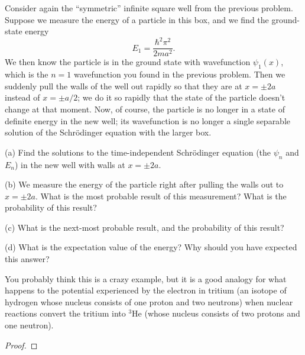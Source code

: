 \documentclass{article}
\begin{document}
\begin{ques}\label{q7}
Consider again the “symmetric” infinite square well from the previous problem. Suppose
we measure the energy of a particle in this box, and we find the ground-state energy
\[
E_1 = \frac{\hbar^2\pi^2}{2ma^2}.
\]
We then know the particle is in the ground state with wavefunction $\psi_1(x)$,
which is the $n = 1$ wavefunction you found in the previous problem. Then we suddenly
pull the walls of the well out rapidly so that they are at $x = \pm 2a$ instead of $x = \pm a/2$; we do
it so rapidly that the state of the particle doesn’t change at that moment. Now, of course,
the particle is no longer in a state of definite energy in the new well; its wavefunction is no
longer a single separable solution of the Schrödinger equation with the larger box.

(a) Find the solutions to the time-independent Schrödinger equation (the $\psi_n$ and $E_n$) in
the new well with walls at $x = \pm 2a$.

(b) We measure the energy of the particle right after pulling the walls out to $x = \pm 2a$.
What is the most probable result of this measurement? What is the probability of
this result?

(c) What is the next-most probable result, and the probability of this result?

(d) What is the expectation value of the energy? Why should you have expected this
answer?

You probably think this is a crazy example, but it is a good analogy for what happens to
the potential experienced by the electron in tritium (an isotope of hydrogen whose nucleus
consists of one proton and two neutrons) when nuclear reactions convert the tritium into
${}^3$He (whose nucleus consists of two protons and one neutron).
\end{ques}

\begin{proof}
\end{proof}

\newpage
\end{document}
